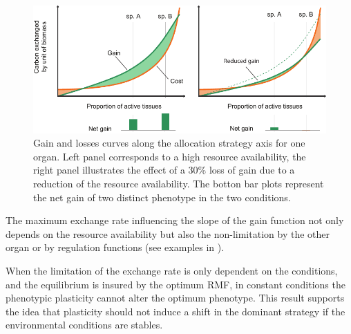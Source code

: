 \begin{figure}
\includegraphics[width = \textwidth]{./2_PP/Figures/Variable/explain_assymetry.pdf}
\caption[Optimum strategy and resource availability]{\textcolor{myGreen}{Gain} and \textcolor{myOrange}{losses} curves along the allocation strategy axis for one organ. Left panel corresponds to a high resource availability, the right panel illustrates the effect of a 30\% loss of gain due to a reduction of the resource availability. The botton bar plots represent the net gain of two distinct phenotype in the two conditions.}\label{fig:asymmetric_gain}
\end{figure}

The maximum exchange rate influencing the slope of the gain function not only depends on the resource availability but also the non-limitation by the other organ or by regulation functions (see examples in \citet{lohier_analyse_2016}).

When the limitation of the exchange rate is only dependent on the conditions, and the equilibrium is insured by the optimum RMF, in constant conditions the phenotypic plasticity cannot alter the optimum phenotype. This result supports the idea that plasticity should not induce a shift in the dominant strategy if the environmental conditions are stables.



